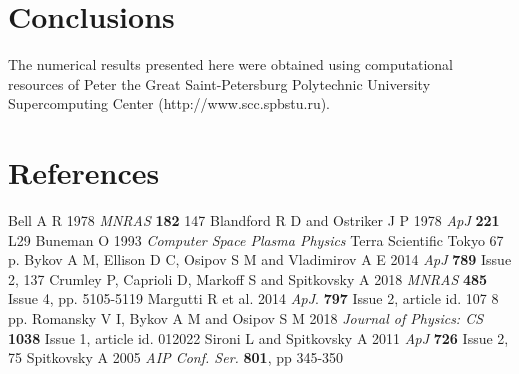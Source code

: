 \documentclass[a4paper]{jpconf}
\begin{document}
\section{Conclusions}

\ack

The numerical results presented here were obtained using computational resources of Peter the Great Saint-Petersburg Polytechnic University Supercomputing Center (http://www.scc.spbstu.ru). 

\section*{References}
\begin{thebibliography}{20}
	 Bell A R 1978 \textit{MNRAS} \textbf{182} 147
	 Blandford R D and Ostriker J P 1978 \textit{ApJ} \textbf{221} L29 
	 Buneman O 1993 \textit{Computer Space Plasma Physics} Terra Scientific Tokyo  67 p.
	 Bykov A M, Ellison D C, Osipov S M and Vladimirov A E 2014 \textit{ApJ} \textbf{789} Issue 2, 137
	 Crumley P, Caprioli D, Markoff S and Spitkovsky A 2018 \textit{MNRAS} \textbf{485} Issue 4, pp. 5105-5119
	 Margutti R et al. 2014 \textit{ApJ}. \textbf{797} Issue 2, article id. 107 8 pp.
	 Romansky V I, Bykov A M and Osipov S M 2018 \textit{Journal of Physics: CS} \textbf{1038} Issue 1, article id. 012022
	 Sironi L and Spitkovsky A 2011 \textit{ApJ} \textbf{726} Issue 2, 75
	 Spitkovsky A 2005 \textit{AIP Conf. Ser.} \textbf{801},  pp 345-350
	
\end{thebibliography}
\end{document}
